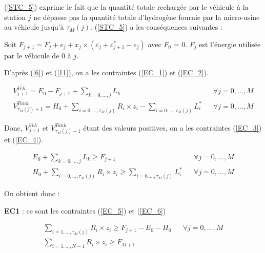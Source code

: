 (\ref{STC_5}) exprime le fait que la quantité totale rechargée par le véhicule à la station $j$ ne dépasse pas la quantité totale d'hydrogène fournie par la micro-usine au véhicule jusqu'à $\tau_M(j)$.
(\ref{STC_5}) a les conséquences suivantes :

Soit $F_{j+1} = F_j + e_j + x_j \times (\varepsilon_j + \varepsilon_{j+1}^*
- e_j)$ avec $F_0$ = 0. $F_j$ est l'énergie utilisée par le véhicule de 0 à $j$.

D'après (\ref{6}) et (\ref{11}), on a les contraintes (\ref{EC_1}) et (\ref{EC_2}).

\begin{subequations}
\begin{align}
\label{EC_1}
V^{Veh}_{j+1} = E_0 - F_{j+1} +\sum_{k=0, \dots, j}L_k  &  &\forall j= 0, \dots, M \\
\label{EC_2}
V^{Tank}_{\tau_M(j)+1} = H_0 +\sum_{i=0, \dots, \tau_M(j)}R_i \times z_i - \sum_{i=0, \dots, \tau_M(j)} L_i^*  &  &\forall j= 0, \dots, M 
\end{align}
\end{subequations}


Donc, $V^{Veh}_{j+1}$ et $V^{Tank}_{\tau_M(j)+1}$ étant des valeurs positives, on a les contraintes (\ref{EC_3}) et (\ref{EC_4}).

\begin{subequations}
\begin{align}
\label{EC_3}
E_0 + \sum_{k=0, \dots, j} L_k \geq F_{j+1} &  &\forall j= 0, \dots, M \\
\label{EC_4}
H_0 +\sum_{i=0, \dots, \tau_M(j)}R_i \times z_i \geq \sum_{i=0, \dots,  \tau_M(j)}L_i^*  &  &\forall j= 0, \dots, M 
\end{align}
\end{subequations}

%

On obtient donc :

\textbf{EC1} : ce sont les contraintes (\ref{EC_5}) et (\ref{EC_6})

\begin{subequations}
\begin{align}
\label{EC_5} \sum_{ i=1, \dots, \tau_M(j)} R_i \times z_i \geq F_{j+1}-E_0-H_0 &  &\forall j= 0, \dots, M \\ 
\label{EC_6} \sum_{i=1, \dots, N-1} R_i \times z_i \geq F_{M+1} &  &
\end{align}
\end{subequations}

